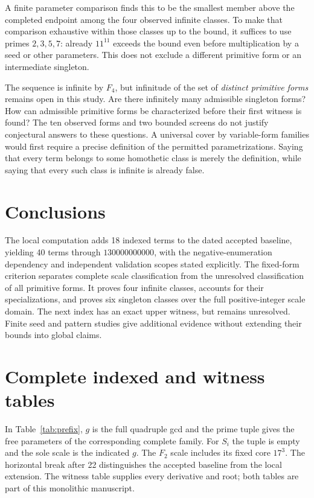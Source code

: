 \documentclass[11pt]{article}
\theoremstyle{definition}
\begin{document}
A finite parameter comparison finds this to be the smallest member above
the completed endpoint among the four observed infinite classes. To make
that comparison exhaustive within those classes up to the bound, it
suffices to use primes $2,3,5,7$: already $11^{11}$ exceeds the bound
even before multiplication by a seed or other parameters. This does not
exclude a different primitive form or an intermediate singleton.

The sequence is infinite by $F_4$, but infinitude of the set of
\emph{distinct primitive forms} remains open in this study. Are there
infinitely many admissible singleton forms? How can admissible primitive
forms be characterized before their first witness is found? The ten
observed forms and two bounded screens do not justify conjectural
answers to these questions. A universal cover by variable-form families
would first require a precise definition of the permitted
parametrizations. Saying that every term belongs to some homothetic
class is merely the definition, while saying that every such class is
infinite is already false.

\section{Conclusions}
The local computation adds 18 indexed terms to the dated accepted baseline,
yielding 40 terms through $130000000000$, with the negative-enumeration dependency
and independent validation scopes stated explicitly. The fixed-form
criterion separates complete scale classification from the unresolved
classification of all primitive forms. It proves four infinite classes,
accounts for their specializations, and proves six singleton classes
over the full positive-integer scale domain. The next index has an exact
upper witness, but remains unresolved. Finite seed and pattern studies
give additional evidence without extending their bounds into global
claims.

\appendix
\section{Complete indexed and witness tables}\label{sec:tables}
In Table~\ref{tab:prefix}, $g$ is the full quadruple gcd and the prime
tuple gives the free parameters of the corresponding complete family.
For $S_i$ the tuple is empty and the sole scale is the indicated $g$.
The $F_2$ scale includes its fixed core $17^3$. The horizontal break
after 22 distinguishes the accepted baseline from the local extension.
The witness table supplies every derivative and root; both tables are
part of this monolithic manuscript.
\end{document}
